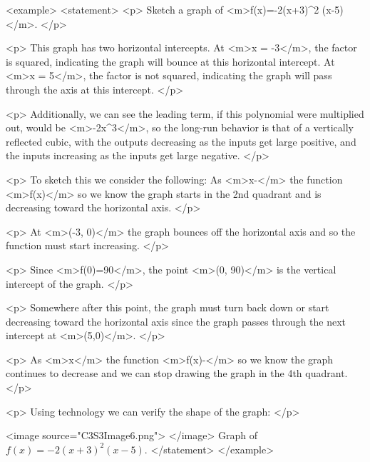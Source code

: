         <example>
            <statement>
                <p>
                    Sketch a graph of <m>f(x)=-2(x+3)^{2} (x-5)</m>.
                </p>

                <p>
                    This graph has two horizontal intercepts.
                    At <m>x = -3</m>, the factor is squared, indicating the graph will bounce at this horizontal intercept.
                    At <m>x = 5</m>, the factor is not squared, indicating the graph will pass through the axis at this intercept.
                </p>

                <p>
                    Additionally, we can see the leading term, if this polynomial were multiplied out, would be <m>-2x^{3}</m>, so the long-run behavior is that of a vertically reflected cubic, with the outputs decreasing as the inputs get large positive, and the inputs increasing as the inputs get large negative.
                </p>

                <p>
                    To sketch this we consider the following: As <m>x\rightarrow -\infty</m> the function <m>f(x)\rightarrow \infty</m> so we know the graph starts in the 2nd quadrant and is decreasing toward the horizontal axis.
                </p>

                <p>
                    At <m>(-3, 0)</m> the graph bounces off the horizontal axis and so the function must start increasing.
                </p>

                <p>
                    Since <m>f(0)=90</m>, the point <m>(0, 90)</m> is the vertical intercept of the graph.
                </p>

                <p>
                    Somewhere after this point, the graph must turn back down or start decreasing toward the horizontal axis since the graph passes through the next intercept at <m>(5,0)</m>.
                </p>

                <p>
                    As <m>x\rightarrow \infty</m> the function <m>f(x)\rightarrow -\infty</m> so we know the graph continues to decrease and we can stop drawing the graph in the 4th quadrant.
                </p>

                <p>
                    Using technology we can verify the shape of the graph:
                </p>

                <image source="C3S3Image6.png">
                </image>
                Graph of $f(x)=-2(x+3)^{2}(x-5)$.
            </statement>
        </example>

